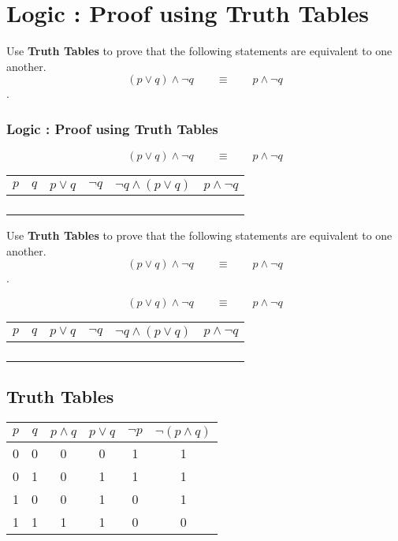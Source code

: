\documentclass[]{report}
\begin{document}
\section{Logic :  Proof using Truth Tables}

Use \textbf{Truth Tables} to prove that the following statements are equivalent to one another.
\[(p \vee q) \wedge \neg q \qquad \equiv \qquad  p\wedge \neg q\].

\frametitle{Logic :  Proof using Truth Tables}

\[(p \vee q) \wedge \neg q \qquad \equiv \qquad  p\wedge \neg q\]
\bigskip
\begin{tabular}{|c|c||c|c|c||c|}
\hline $p$ & $q$ & $p \vee q$ & $\neg q$ & $\neg q \wedge (p \vee q)$ & $p\wedge \neg q$ \\ 
\hline  &  &  &  &  &  \\ 
\hline  &  &  &  &  &  \\ 
\hline  &  &  &  &  &  \\ 
\hline  &  &  &  &  &  \\ 
\hline 
\end{tabular} 

\newpage


Use \textbf{Truth Tables} to prove that the following statements are equivalent to one another.
\[(p \vee q) \wedge \neg q \qquad \equiv \qquad  p\wedge \neg q\].


\[(p \vee q) \wedge \neg q \qquad \equiv \qquad  p\wedge \neg q\]
\bigskip
\begin{tabular}{|c|c||c|c|c||c|}
\hline $p$ & $q$ & $p \vee q$ & $\neg q$ & $\neg q \wedge (p \vee q)$ & $p\wedge \neg q$ \\ 
\hline  &  &  &  &  &  \\ 
\hline  &  &  &  &  &  \\ 
\hline  &  &  &  &  &  \\ 
\hline  &  &  &  &  &  \\ 
\hline 
\end{tabular} 
\subsection{Truth Tables}
{
\Large
\begin{center}
\begin{tabular}{|c|c||c|c||c|c|}
\hline $p$ & $q$ & $p \wedge q$ & $p\vee q$ & $\neg p$  & $\neg (p \wedge q)$ \\ 
\hline 0 & 0 & 0 & 0 & 1 & 1 \\ 
\hline 0 & 1 & 0 & 1 & 1 & 1 \\ 
\hline 1 & 0 & 0 & 1 & 0 & 1 \\ 
\hline 1 & 1 & 1 & 1 & 0 & 0 \\ 
\hline 
\end{tabular} 
\end{center}
}
\end{document}
